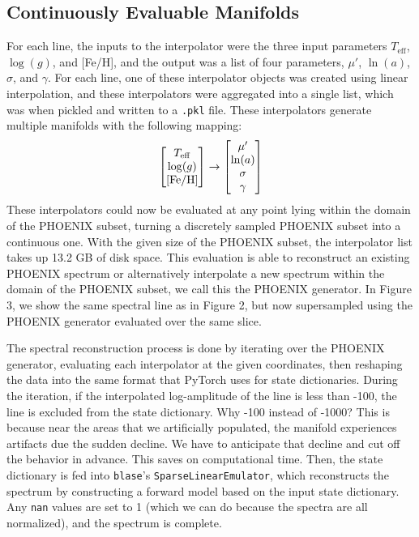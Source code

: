 \documentclass[twocolumn]{aastex631}
\begin{document}
\subsection{Continuously Evaluable Manifolds}
For each line, the inputs to the interpolator were the three input parameters $T_{\mathrm{eff}}$,
$\log(g)$, and [Fe/H], and the output was a list of four parameters, 
$\mu'$, $\ln(a)$, $\sigma$, and $\gamma$. For each line, one of these 
interpolator objects was created using linear interpolation, and these 
interpolators were aggregated into a single list, which was when pickled 
and written to a \texttt{.pkl} file. These interpolators generate multiple 
manifolds with the following mapping:
\begin{gather}
    \mqty[T_{\mathrm{eff}} \\ \log(g) \\ \mathrm{[Fe/H]}] \rightarrow \mqty[\mu' \\ \ln(a) \\ \sigma \\ \gamma]
\end{gather}
These interpolators could now be evaluated at any point lying within the 
domain of the PHOENIX subset, turning a discretely sampled PHOENIX subset 
into a continuous one. With the given size of the PHOENIX subset, the 
interpolator list takes up 13.2 GB of disk space. This evaluation 
is able to reconstruct an existing PHOENIX spectrum or alternatively 
interpolate a new spectrum within the domain of the PHOENIX subset,
we call this the PHOENIX generator. In Figure 3, we show the same 
spectral line as in Figure 2, but now supersampled using the PHOENIX
generator evaluated over the same slice.

The spectral reconstruction process is done by iterating over the 
PHOENIX generator, evaluating each interpolator at the given coordinates, 
then reshaping the data into the same format that PyTorch uses for 
state dictionaries. During the iteration, if the interpolated
log-amplitude of the line is less than -100, the line is excluded from the 
state dictionary. Why -100 instead of -1000? This is because near the 
areas that we artificially populated, the manifold experiences artifacts due 
the sudden decline. We have to anticipate that decline and cut off the 
behavior in advance. This saves on computational time. Then, the state
dictionary is fed into \texttt{blase}'s \texttt{SparseLinearEmulator},
which reconstructs the spectrum by constructing a forward model based on 
the input state dictionary. Any \texttt{nan} values are set to 1 (which we 
can do because the spectra are all normalized), and the spectrum is 
complete.
\end{document}
